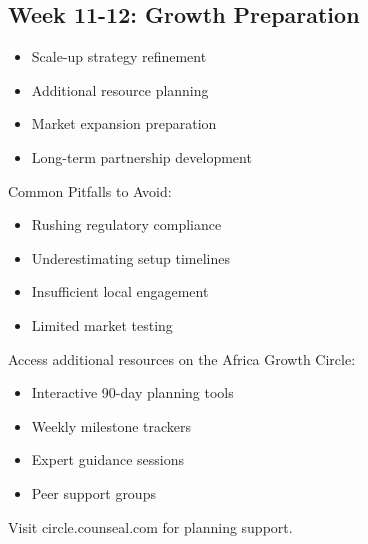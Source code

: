 \subsection{Week 11-12: Growth Preparation}
\begin{itemize}
    \item Scale-up strategy refinement
    \item Additional resource planning
    \item Market expansion preparation
    \item Long-term partnership development
\end{itemize}

\begin{warningbox}
Common Pitfalls to Avoid:
\begin{itemize}
    \item Rushing regulatory compliance
    \item Underestimating setup timelines
    \item Insufficient local engagement
    \item Limited market testing
\end{itemize}
\end{warningbox}

\begin{communitybox}
Access additional resources on the Africa Growth Circle:
\begin{itemize}
    \item Interactive 90-day planning tools
    \item Weekly milestone trackers
    \item Expert guidance sessions
    \item Peer support groups
\end{itemize}
Visit circle.counseal.com for planning support.
\end{communitybox}

